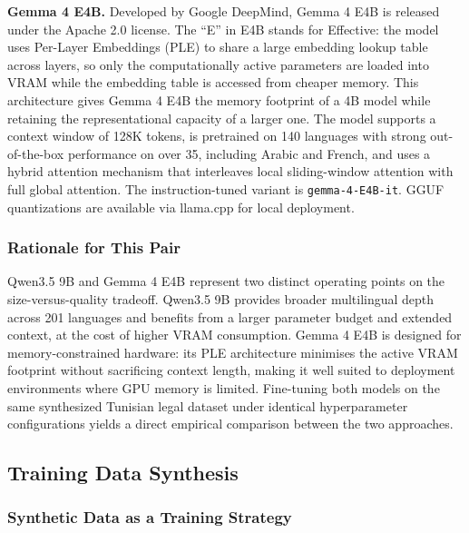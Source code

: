\textbf{Gemma 4 E4B.}
Developed by Google DeepMind, Gemma 4 E4B \cite{google2025gemma4} is released under the Apache 2.0 license. The ``E'' in E4B stands for Effective: the model uses Per-Layer Embeddings (PLE) to share a large embedding lookup table across layers, so only the computationally active parameters are loaded into \ac{VRAM} while the embedding table is accessed from cheaper memory. This architecture gives Gemma 4 E4B the memory footprint of a 4B model while retaining the representational capacity of a larger one. The model supports a context window of 128K tokens, is pretrained on 140 languages with strong out-of-the-box performance on over 35, including Arabic and French, and uses a hybrid attention mechanism that interleaves local sliding-window attention with full global attention. The instruction-tuned variant is \texttt{gemma-4-E4B-it}. \ac{GGUF} quantizations are available via llama.cpp for local deployment.

\subsubsection{Rationale for This Pair}

Qwen3.5 9B and Gemma 4 E4B represent two distinct operating points on the size-versus-quality tradeoff. Qwen3.5 9B provides broader multilingual depth across 201 languages and benefits from a larger parameter budget and extended context, at the cost of higher \ac{VRAM} consumption. Gemma 4 E4B is designed for memory-constrained hardware: its PLE architecture minimises the active \ac{VRAM} footprint without sacrificing context length, making it well suited to deployment environments where \ac{GPU} memory is limited. Fine-tuning both models on the same synthesized Tunisian legal dataset under identical hyperparameter configurations yields a direct empirical comparison between the two approaches.

\subsection{Training Data Synthesis}
\label{sec:training-data-synthesis}

\subsubsection{Synthetic Data as a Training Strategy}
\label{subsec:synthetic-data-strategy}

